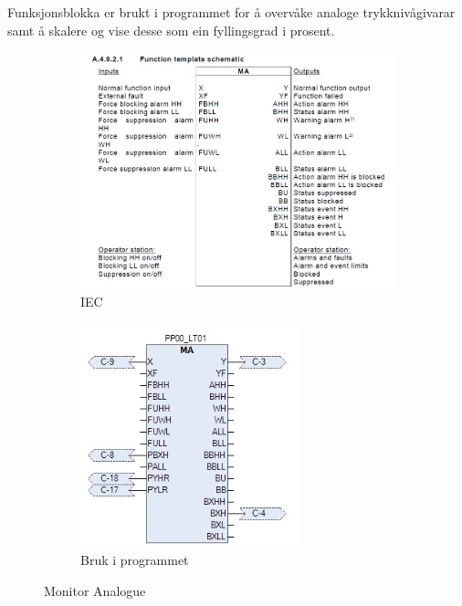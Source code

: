 Funksjonsblokka er brukt i programmet for å overvåke analoge trykknivågivarar samt å skalere og vise desse som ein fyllingsgrad i prosent.

\begin{figure}[htbp]
    \centering
    \begin{subfigure}[b]{0.45\textwidth}
        \centering
        \includegraphics[width=1\textwidth]{Bilder/MABlokkIEC.png}
        \caption{IEC}\label{fig:Monitor Analogue blokk IEC}
    \end{subfigure}
    \hfill
    \begin{subfigure}[b]{0.45\textwidth}
        \centering
        \includegraphics[width=0.7\textwidth]{Bilder/MABlokkIProgrammet.png}
        \caption{Bruk i programmet}\label{fig:Monitor Analogue blokk i programmet}
    \end{subfigure}
    \caption{Monitor Analogue}\label{fig:Monitor Analogue}
\end{figure}

